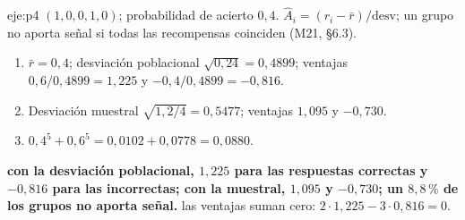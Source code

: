 \begin{solucion}{eje:p4}
\datos $(1,0,0,1,0)$; probabilidad de acierto $0{,}4$.
\planteamiento $\widehat A_i=(r_i-\bar r)/\mathrm{desv}$; un grupo no aporta señal si todas las recompensas coinciden (M21, §6.3).
\pasos
\begin{enumerate}[label=\arabic*.]
  \item $\bar r=0{,}4$; desviación poblacional $\sqrt{0{,}24}=0{,}4899$; ventajas $0{,}6/0{,}4899=1{,}225$ y $-0{,}4/0{,}4899=-0{,}816$.
  \item Desviación muestral $\sqrt{1{,}2/4}=0{,}5477$; ventajas $1{,}095$ y $-0{,}730$.
  \item $0{,}4^{5}+0{,}6^{5}=0{,}0102+0{,}0778=0{,}0880$.
\end{enumerate}
\resultado \textbf{con la desviación poblacional, $1{,}225$ para las respuestas correctas y $-0{,}816$ para las incorrectas; con la muestral, $1{,}095$ y $-0{,}730$; un $8{,}8\,\%$ de los grupos no aporta señal.}
\comprobacion las ventajas suman cero: $2\cdot 1{,}225-3\cdot 0{,}816=0$.
\end{solucion}

